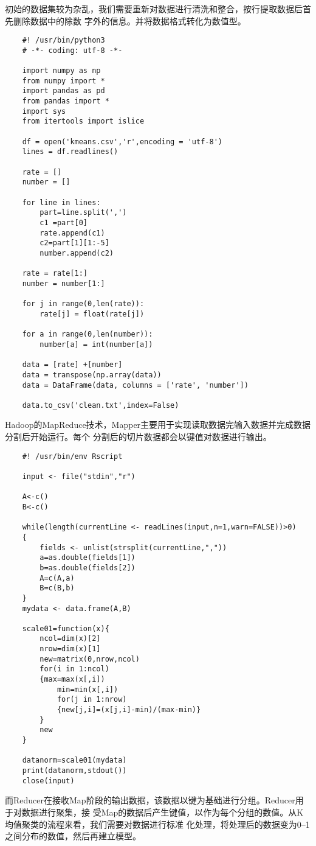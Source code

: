 初始的数据集较为杂乱，我们需要重新对数据进行清洗和整合，按行提取数据后首先删除数据中的除数
字外的信息。并将数据格式转化为数值型。

\begin{lstlisting}
	#! /usr/bin/python3
	# -*- coding: utf-8 -*-

	import numpy as np
	from numpy import *
	import pandas as pd
	from pandas import *
	import sys
	from itertools import islice

	df = open('kmeans.csv','r',encoding = 'utf-8')
	lines = df.readlines()

	rate = []
	number = []

	for line in lines:
	    part=line.split(',')
	    c1 =part[0]
	    rate.append(c1)
	    c2=part[1][1:-5]
	    number.append(c2)

	rate = rate[1:]
	number = number[1:]

	for j in range(0,len(rate)):
	    rate[j] = float(rate[j])

	for a in range(0,len(number)):
	    number[a] = int(number[a])

	data = [rate] +[number]
	data = transpose(np.array(data))
	data = DataFrame(data, columns = ['rate', 'number'])

	data.to_csv('clean.txt',index=False)
\end{lstlisting}

Hadoop的MapReduce技术，Mapper主要用于实现读取数据完输入数据并完成数据分割后开始运行。每个
分割后的切片数据都会以键值对数据进行输出。

\begin{lstlisting}
	#! /usr/bin/env Rscript

	input <- file("stdin","r")

	A<-c()
	B<-c()

	while(length(currentLine <- readLines(input,n=1,warn=FALSE))>0)
	{
	    fields <- unlist(strsplit(currentLine,","))
	    a=as.double(fields[1])
	    b=as.double(fields[2])
	    A=c(A,a)
	    B=c(B,b)
	}
	mydata <- data.frame(A,B)

	scale01=function(x){
	    ncol=dim(x)[2]
	    nrow=dim(x)[1]
	    new=matrix(0,nrow,ncol)
	    for(i in 1:ncol)
	    {max=max(x[,i])
	        min=min(x[,i])
	        for(j in 1:nrow)
	        {new[j,i]=(x[j,i]-min)/(max-min)}
	    }
	    new
	}

	datanorm=scale01(mydata)
	print(datanorm,stdout())
	close(input)
\end{lstlisting}

而Reducer在接收Map阶段的输出数据，该数据以键为基础进行分组。Reducer用于对数据进行聚集，接
受Map的数据后产生键值，以作为每个分组的数值。从K均值聚类的流程来看，我们需要对数据进行标准
化处理，将处理后的数据变为0--1之间分布的数值，然后再建立模型。

